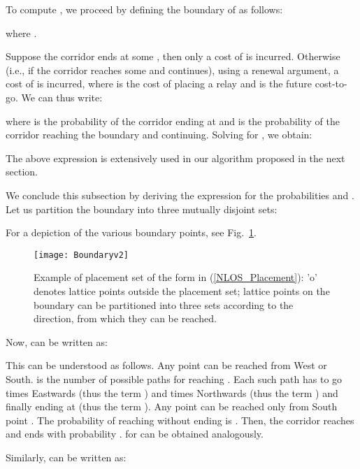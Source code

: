 \documentclass[conference]{IEEEtran}
\begin{document}
To compute , we proceed by defining the boundary  of  as follows:

where .

Suppose the corridor ends at some , then only a cost of 
 is incurred. Otherwise (i.e., if the corridor reaches some  and 
continues), using a renewal argument, a cost of  is incurred, where 
 is the cost of placing a relay and  is the future cost-to-go. We can thus write:

where  is the probability of the corridor ending at  and 
 is the probability of the corridor reaching the boundary and continuing. 
Solving for , we obtain:
 
The above expression is extensively used in our algorithm proposed in the next section.

We conclude this subsection by deriving the expression for the probabilities 
 and . Let us partition the 
boundary  into three mutually disjoint sets:

For a depiction of the various boundary points, see Fig.~\ref{Boundary_figure}.
\begin{figure}[t!]
\centering
\texttt{[image: Boundaryv2]}
\caption{Example of placement set of the form in (\ref{NLOS_Placement}): 'o' denotes lattice 
points outside the placement set; lattice points on the boundary can be partitioned into three 
sets according to the direction, from which they can be reached.}
\label{Boundary_figure}
\end{figure}
Now,  can be written as:

This can be understood as follows. Any point  can be reached from West or South.  is the number of 
possible paths for reaching . Each such path has to go  times Eastwards (thus the 
term ) and  times Northwards (thus the term ) and finally ending at  
(thus the term ). Any point  can be reached only 
from South point . The probability of reaching  without ending is 
. Then, the corridor reaches  and ends 
with probability .  for  can 
be obtained analogously. 

Similarly,  can be written as:
\end{document}
